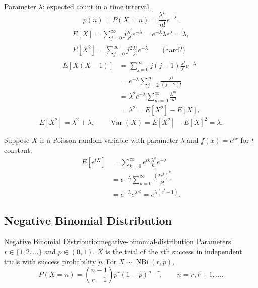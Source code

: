 \begin{example}
  Parameter $\lambda$: expected count in a time interval.
  \[
    p(n)=P(X=n)=\frac{\lambda^n}{n!}e^{-\lambda}.
  \]
  \begin{gather*}
    E[X]=\sum_{j=0}^{\infty}j\frac{\lambda^j}{j!}e^{-\lambda}
    =e^{-\lambda}\lambda e^\lambda=\lambda,\\
    E[X^2]=\sum_{j=0}^{\infty}j^2\frac{\lambda^j}{j!}e^{-\lambda}
    \qquad\text{(hard?)}
  \end{gather*}
  \begin{align*}
    E[X(X-1)] & =\sum_{j=0}^{\infty}j(j-1)\frac{\lambda^j}{j!}e^{-\lambda}    \\
              & =e^{-\lambda}\sum_{j=2}^{\infty}\frac{\lambda^j}{(j-2)!}      \\
              & =\lambda^2e^{-\lambda}\sum_{m=0}^{\infty}\frac{\lambda^m}{m!} \\
              & =\lambda^2=E[X^2]-E[X].
  \end{align*}
  \[
    E[X^2]=\lambda^2+\lambda,\qquad
    \operatorname{Var}(X)=E[X^2]-E[X]^2=\lambda.
  \]
\end{example}

\begin{example}
  Suppose $X$ is a Poisson random variable with parameter $\lambda$ and
  $f(x)=e^{tx}$ for $t$ constant.
  \begin{align*}
    E[e^{tX}] & =\sum_{k=0}^{\infty}e^{tk}\frac{\lambda^k}{k!}e^{-\lambda} \\
              & =e^{-\lambda}\sum_{k=0}^{\infty}\frac{(\lambda e^t)^k}{k!} \\
              & =e^{-\lambda}e^{\lambda e^t}=e^{\lambda(e^t-1)}.
  \end{align*}
\end{example}

\subsection{Negative Binomial Distribution}

\begin{definition}{Negative Binomial Distribution}{negative-binomial-distribution}
  Parameters $r\in\{1,2,\ldots\}$ and $p\in(0,1)$.
  $X$ is the trial of the $r$th success in independent trials with success probability $p$.
  For $X\sim\operatorname{NBi}(r,p)$,
  \[
    P(X=n)=\binom{n-1}{r-1}p^r(1-p)^{n-r},\qquad n=r,r+1,\ldots.
  \]
\end{definition}

